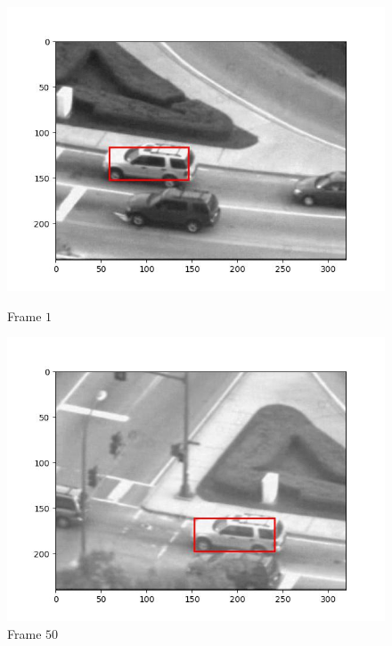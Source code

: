 \begin{figure}[H]
  \centering
  \begin{minipage}{.49\textwidth}
    \centering
    \includegraphics[width=\textwidth]{./figures/ic_affine/car2/frame000001.jpg}
    \caption{Frame $1$}
  \end{minipage}
  \hfill
  \begin{minipage}{.49\textwidth}
    \centering
    \includegraphics[width=\textwidth]{./figures/ic_affine/car2/frame000050.jpg}
    \caption{Frame $50$}
  \end{minipage}
  \hfill
  \begin{minipage}{.49\textwidth}
    \centering

\end{minipage}
\end{figure}
